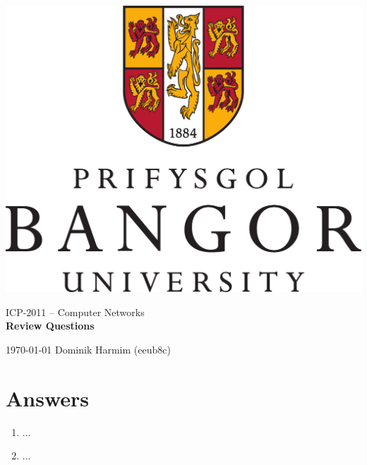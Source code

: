 \documentclass[a4paper, 11pt]{article}
\begin{document}
	\begin{titlepage}
		\begin{center}
			\includegraphics[width=0.5\linewidth]{inc/Bangor_logo.pdf} \\


			\Huge{ICP-2011 -- Computer Networks} \\
			\Huge{\textbf{Review Questions}}

		\end{center}

		{\Large
			\today
			\hfill
			Dominik Harmim (eeub8c)
		}
	\end{titlepage}



	\section*{Answers}

	\begin{enumerate}
		\item
			...

		\item
			...
	\end{enumerate}
\end{document}
